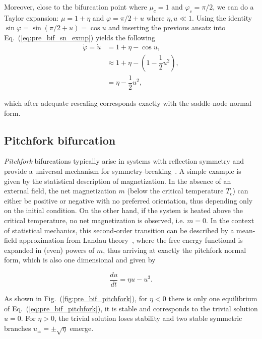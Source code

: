 \begin{exmp}
    Moreover, close to the bifurcation point where $\mu_c = 1$ and $\varphi_c = \pi/2$,
    we can do a Taylor expansion: $\mu = 1 + \eta$ and $\varphi = \pi/2 + u$ 
    where $\eta, u \ll 1$. Using the identity $\sin \varphi = \sin (\pi/2 + u) = \cos u$
    and inserting the previous ansatz into Eq.~(\ref{eq:pre_bif_sn_exmp}) yields
    the following
    \begin{align*}
        \dot{\varphi} = \dot{u} &= 1 + \eta - \cos u, \\ 
        &\approx 1 + \eta - (1 - \dfrac12 u^2), \\
        &= \eta - \dfrac12 u^2,
    \end{align*}

    \noindent which after adequate rescaling corresponds exactly with the saddle-node
    normal form.
    

\end{exmp}

\subsection{Pitchfork bifurcation}

{\em Pitchfork} bifurcations typically arise in systems with reflection symmetry and 
provide a universal mechanism for symmetry-breaking~\cite{strogatz2018nonlinear}. 
A simple example is given by the statistical description of magnetization. 
In the absence of an external field, the net magnetization $m$ 
(below the critical temperature $T_c$) can either be positive or negative 
with no preferred orientation, thus depending only on the initial condition. On the
other hand, if the system is heated above the critical temperature, no net magnetization
is observed, i.e. $m=0$. In the context of statistical mechanics, this second-order
transition can be described by a mean-field approximation from Landau 
theory~\cite{landau2013statistical,kardar2007statistical}, where
the free energy functional is expanded in (even) powers of $m$, thus arriving at exactly
the pitchfork normal form, which is also one dimensional and given by

\begin{equation}
    \dfrac{du}{dt} = \eta u - u ^ 3.
    \label{eq:pre_bif_pitchfork}
\end{equation}

As shown in Fig.~(\ref{fig:pre_bif_pitchfork}), for $\eta < 0$ there is only one 
equilibrium of Eq.~(\ref{eq:pre_bif_pitchfork}), it is stable and corresponds
to the trivial solution $u=0$. For $\eta > 0$, the trivial solution loses stability
and two stable symmetric branches $u_\pm = \pm \sqrt{\eta}$ emerge. 

